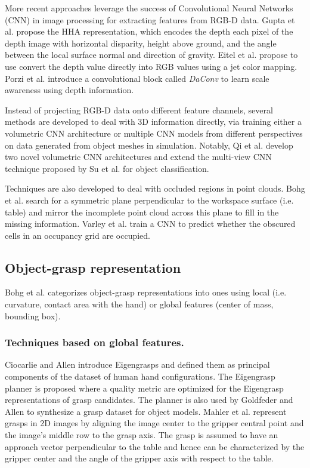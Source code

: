 \documentclass[runningheads]{../llncs}
\begin{document}
More recent approaches leverage the success of Convolutional Neural Networks (CNN) in image processing for extracting
features from RGB-D data. Gupta et al. \cite{Gupta2014RGBDFeatures} propose the HHA representation, which encodes the
depth each pixel of the depth image with horizontal disparity, height above ground, and the angle between the local
surface normal and direction of gravity. Eitel et al. \cite{Eitel2015} propose to use convert the depth value directly
into RGB values using a jet color mapping. Porzi et al. \cite{Porzi2017} introduce a convolutional block called
\emph{DaConv} to learn scale awareness using depth information.

Instead of projecting RGB-D data onto different feature channels, several methods are developed to deal with 3D
information directly, via training either a volumetric CNN architecture or multiple CNN models from different
perspectives on data generated from object meshes in simulation. Notably, Qi et al. \cite{Qi2016} develop two novel
volumetric CNN architectures and extend the multi-view CNN technique proposed by Su et al. \cite{Su2015} for object
classification.

Techniques are also developed to deal with occluded regions in point clouds. Bohg et al. \cite{Bohg2011MindTheGap}
search for a symmetric plane perpendicular to the workspace surface (i.e. table) and mirror the incomplete point cloud
across this plane to fill in the missing information. Varley et al. \cite{Varley2017} train a CNN to predict whether
the obscured cells in an occupancy grid are occupied.

\subsection{Object-grasp representation}
Bohg et al. categorizes object-grasp representations into ones using local (i.e. curvature, contact area with the hand)
or global features (center of mass, bounding box).

\subsubsection*{Techniques based on global features.}

Ciocarlie and Allen \cite{Ciocarlie2009} introduce Eigengrasps and defined them as principal components of the dataset
of human hand configurations. The Eigengrasp planner is proposed where a quality metric are optimized for the Eigengrasp
representations of grasp candidates. The planner is also used by Goldfeder and Allen \cite{Goldfeder2011} to synthesize
a grasp dataset for object models. Mahler et al. \cite{mahler2017} represent grasps in 2D images by aligning the image
center to the gripper central point and the image's middle row to the grasp axis. The grasp is assumed to have an
approach vector perpendicular to the table and hence can be characterized by the gripper center and the angle of the
gripper axis with respect to the table.
\end{document}

